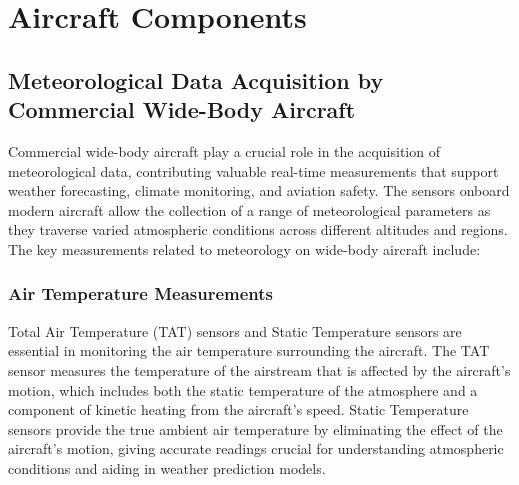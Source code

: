 \documentclass[a4paper, 12pt]{report}
\begin{document}
\chapter{Aircraft Components}

\section{Meteorological Data Acquisition by Commercial Wide-Body Aircraft}

Commercial wide-body aircraft play a crucial role in the acquisition of meteorological data, contributing valuable real-time measurements that support weather forecasting, climate monitoring, and aviation safety. The sensors onboard modern aircraft allow the collection of a range of meteorological parameters as they traverse varied atmospheric conditions across different altitudes and regions. The key measurements related to meteorology on wide-body aircraft include:

\subsection{Air Temperature Measurements}
Total Air Temperature (TAT) sensors and Static Temperature sensors are essential in monitoring the air temperature surrounding the aircraft. The TAT sensor measures the temperature of the airstream that is affected by the aircraft’s motion, which includes both the static temperature of the atmosphere and a component of kinetic heating from the aircraft’s speed. Static Temperature sensors provide the true ambient air temperature by eliminating the effect of the aircraft’s motion, giving accurate readings crucial for understanding atmospheric conditions and aiding in weather prediction models.
\end{document}

